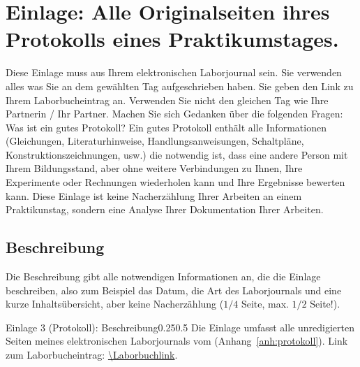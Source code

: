 
\section{Einlage: Alle Originalseiten ihres Protokolls eines Praktikumstages.}
\label{sec:protokoll}

\begin{hinweise}
Diese Einlage muss aus Ihrem elektronischen Laborjournal sein. Sie verwenden alles was Sie an dem gewählten Tag
aufgeschrieben haben. Sie geben den Link zu Ihrem Laborbucheintrag an.
Verwenden Sie nicht den gleichen Tag wie Ihre Partnerin / Ihr Partner. Machen Sie sich Gedanken über die
folgenden Fragen: Was ist ein gutes Protokoll? Ein gutes Protokoll enthält alle Informationen (Gleichungen,
Literaturhinweise, Handlungsanweisungen, Schaltpläne, Konstruktionszeichnungen, usw.) die notwendig ist, dass
eine andere Person mit Ihrem Bildungsstand, aber ohne weitere Verbindungen zu Ihnen, Ihre Experimente oder
Rechnungen wiederholen kann und Ihre Ergebnisse bewerten kann.
Diese Einlage ist keine Nacherzählung Ihrer Arbeiten an einem Praktikunstag, sondern eine Analyse Ihrer
Dokumentation Ihrer Arbeiten.
\end{hinweise}

\subsection{Beschreibung}
\begin{hinweise}
Die Beschreibung gibt alle notwendigen Informationen an, die die Einlage beschreiben, also zum Beispiel das
Datum, die Art des Laborjournals und eine kurze Inhaltsübersicht, aber keine Nacherzählung ($1/4$ Seite, max.
$1/2$ Seite!).
\end{hinweise}
\begin{umfang}{Einlage 3 (Protokoll): Beschreibung}{0.25}{0.5}
Die Einlage umfasst alle unredigierten Seiten meines elektronischen Laborjournals vom \Protokolldatum{}
(Anhang~\ref{anh:protokoll}). Link zum Laborbucheintrag: \expandafter\url\expandafter{\Laborbuchlink}.

\end{umfang}

